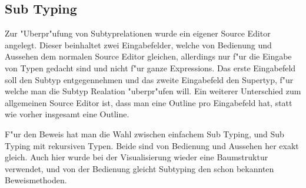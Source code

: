 \subsection{Sub Typing}
Zur "Uberpr"ufung von Subtyprelationen wurde ein eigener Source Editor angelegt. Dieser beinhaltet zwei Eingabefelder,
welche von Bedienung und Aussehen dem normalen Source Editor gleichen, allerdings nur f"ur die Eingabe von Typen gedacht
sind und nicht f"ur ganze Expressions. Das erste Eingabefeld soll den Subtyp entgegennehmen und das zweite Eingabefeld 
den Supertyp, f"ur welche man die Subtyp Realation "uberpr"ufen will. Ein weiterer Unterschied zum allgemeinen Source 
Editor ist, dass man eine Outline pro Eingabefeld hat, statt wie vorher insgesamt eine Outline.

F"ur den Beweis hat man die Wahl zwischen einfachem Sub Typing, und Sub Typing mit rekursiven Typen. Beide sind von 
Bedienung und Aussehen her exakt gleich. Auch hier wurde bei der Visualisierung wieder eine Baumstruktur verwendet,
und von der Bedienung gleicht Subtyping den schon bekannten Beweismethoden. 



